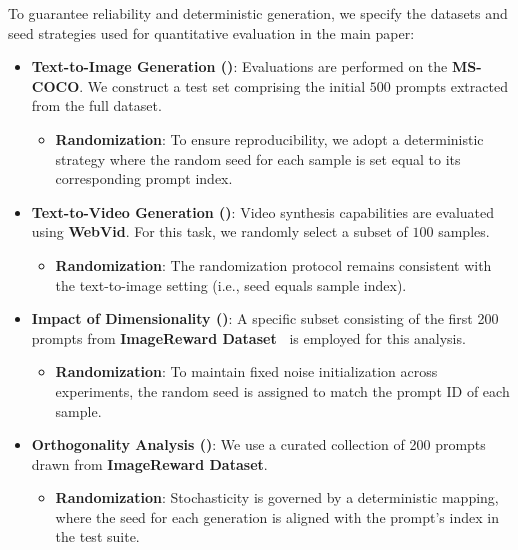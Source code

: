 To guarantee reliability and deterministic generation, we specify the datasets and seed strategies used for quantitative evaluation in the main paper:

\begin{itemize}
    
    \item \textbf{Text-to-Image Generation ()}:
    Evaluations are performed on the \textbf{MS-COCO}. We construct a test set comprising the initial $500$ prompts extracted from the full dataset.
    \begin{itemize}
        \item \textbf{Randomization}: To ensure reproducibility, we adopt a deterministic strategy where the random seed for each sample is set equal to its corresponding prompt index.
    \end{itemize}

    \item \textbf{Text-to-Video Generation ()}:
    Video synthesis capabilities are evaluated using \textbf{WebVid}. For this task, we randomly select a subset of $100$ samples.
    \begin{itemize}
        \item \textbf{Randomization}: The randomization protocol remains consistent with the text-to-image setting (i.e., seed equals sample index).
    \end{itemize}

    \item \textbf{Impact of Dimensionality ()}:
    A specific subset consisting of the first 200 prompts from \textbf{ImageReward Dataset~\citep{xu2023imagereward}} is employed for this analysis.
    \begin{itemize}
        \item \textbf{Randomization}: To maintain fixed noise initialization across experiments, the random seed is assigned to match the prompt ID of each sample.
    \end{itemize}

    \item \textbf{Orthogonality Analysis ()}:
    We use a curated collection of 200 prompts drawn from \textbf{ImageReward Dataset}.
    \begin{itemize}
        \item \textbf{Randomization}: Stochasticity is governed by a deterministic mapping, where the seed for each generation is aligned with the prompt's index in the test suite.
    \end{itemize}


\end{itemize}
